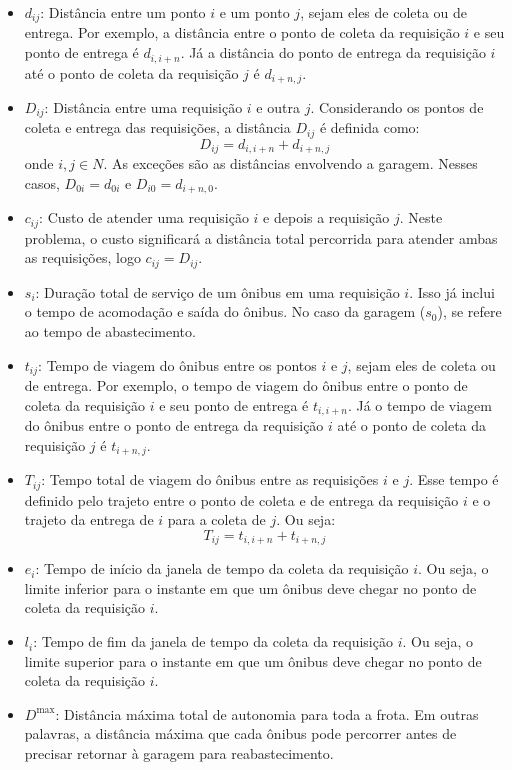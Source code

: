 \documentclass[12pt, a4paper]{article}
\begin{document}
\begin{itemize}
    \item $d_{ij}$: Distância entre um ponto $i$ e um ponto $j$, sejam eles de coleta ou de entrega. Por exemplo, a distância entre o ponto de coleta da requisição $i$ e seu ponto de entrega é $d_{i, i+n}$. Já a distância do ponto de entrega da requisição $i$ até o ponto de coleta da requisição $j$ é $d_{i+n, j}$.
    \item $D_{ij}$: Distância entre uma requisição $i$ e outra $j$. Considerando os pontos de coleta e entrega das requisições, a distância $D_{ij}$ é definida como: $$ D_{ij} = d_{i, i+n} + d_{i+n, j} $$ onde $i, j \in N$. As exceções são as distâncias envolvendo a garagem. Nesses casos, $D_{0i} = d_{0i}$ e $D_{i0} = d_{i+n, 0}$.
    \item $c_{ij}$: Custo de atender uma requisição $i$ e depois a requisição $j$. Neste problema, o custo significará a distância total percorrida para atender ambas as requisições, logo $c_{ij} = D_{ij}$.
    \item $s_i$: Duração total de serviço de um ônibus em uma requisição $i$. Isso já inclui o tempo de acomodação e saída do ônibus. No caso da garagem ($s_0$), se refere ao tempo de abastecimento.
    \item $t_{ij}$: Tempo de viagem do ônibus entre os pontos $i$ e $j$, sejam eles de coleta ou de entrega. Por exemplo, o tempo de viagem do ônibus entre o ponto de coleta da requisição $i$ e seu ponto de entrega é $t_{i, i+n}$. Já o tempo de viagem do ônibus entre o ponto de entrega da requisição $i$ até o ponto de coleta da requisição $j$ é $t_{i+n, j}$.
    \item $T_{ij}$: Tempo total de viagem do ônibus entre as requisições $i$ e $j$. Esse tempo é definido pelo trajeto entre o ponto de coleta e de entrega da requisição $i$ e o trajeto da entrega de $i$ para a coleta de $j$. Ou seja: $$T_{ij} = t_{i, i+n} + t_{i+n, j}$$
    \item $e_i$: Tempo de início da janela de tempo da coleta da requisição $i$. Ou seja, o limite inferior para o instante em que um ônibus deve chegar no ponto de coleta da requisição $i$.
    \item $l_i$: Tempo de fim da janela de tempo da coleta da requisição $i$. Ou seja, o limite superior para o instante em que um ônibus deve chegar no ponto de coleta da requisição $i$.
    \item $D^{\max}$: Distância máxima total de autonomia para toda a frota. Em outras palavras, a distância máxima que cada ônibus pode percorrer antes de precisar retornar à garagem para reabastecimento.
\end{itemize}
\end{document}

